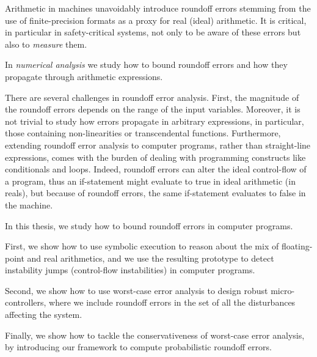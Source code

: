 %
Arithmetic in machines unavoidably introduce roundoff errors stemming from the use of finite-precision formats as a proxy for real (ideal) arithmetic. 
%
It is critical, in particular in safety-critical systems, not only to be aware of these errors but also to \emph{measure} them.
%

In \emph{numerical analysis} we study how to bound roundoff errors and how they propagate through arithmetic expressions.
%

There are several challenges in roundoff error analysis. 
%
First, the magnitude of the roundoff errors depends on the range of the input variables. 
%
Moreover, it is not trivial to study how errors propagate in arbitrary expressions, in particular, those containing non-linearities or transcendental functions.
%
Furthermore, extending roundoff error analysis to computer programs, rather than straight-line expressions, comes with the burden of dealing with programming constructs like conditionals and loops. 
%
Indeed, roundoff errors can alter the ideal control-flow of a program, thus an if-statement might evaluate to true in ideal arithmetic (in reals), but because of roundoff errors, the same if-statement evaluates to false in the machine. 
%
%
%
%
%

In this thesis, we study how to bound roundoff errors in computer programs.

First, we show how to use symbolic execution to reason about the mix of floating-point and real arithmetics, and we use the resulting prototype to detect instability jumps (control-flow instabilities) in computer programs.
%

Second, we show how to use worst-case error analysis to design robust micro-controllers, where we include roundoff errors in the set of all the disturbances affecting the system.
%

Finally, we show how to tackle the conservativeness of worst-case error analysis, by introducing our framework to compute probabilistic roundoff errors.